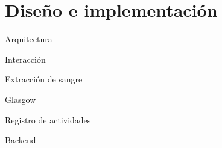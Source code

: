 \section{Diseño e implementación}
\setcounter{sectiontotal}{5}

\begin{frame}{Arquitectura}\end{frame}
\begin{frame}{Interacción}\end{frame}
\begin{frame}{Extracción de sangre}\end{frame}
\begin{frame}{Glasgow}\end{frame}
\begin{frame}{Registro de actividades}\end{frame}
\begin{frame}{Backend}\end{frame}




